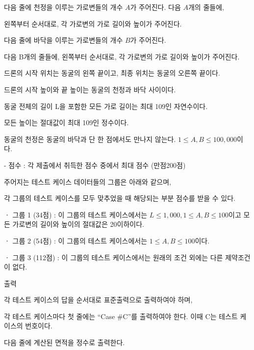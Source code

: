 \documentclass [12pt] {oblivoir}
\begin{document}
\vspace{3mm}

다음 줄에 천정을 이루는 가로변들의 개수 $A$가 주어진다. 다음 $A$개의 줄들에,

왼쪽부터 순서대로, 각 가로변의 가로 길이와 높이가 주어진다.

다음 줄에 바닥을 이루는 가로변들의 개수 $B$가 주어진다.

다음 B개의 줄들에, 왼쪽부터 순서대로, 각 가로변의 가로 길이와 높이가 주어진다.

\vspace{3mm}

드론의 시작 위치는 동굴의 왼쪽 끝이고, 최종 위치는 동굴의 오른쪽 끝이다.

드론의 시작 높이와 끝 높이는 동굴의 천정과 바닥 사이이다.

동굴 전체의 길이 L을 포함한 모든 가로 길이는 최대 109인 자연수이다.

모든 높이는 절대값이 최대 109인 정수이다.

동굴의 천정은 동굴의 바닥과 단 한 점에서도 만나지 않는다. $1 \le A, B \le 100,000$이다.

\vspace{3mm}

- 점수 : 각 제출에서 취득한 점수 중에서 최대 점수 (만점200점)

    주어지는 테스트 케이스 데이터들의 그룹은 아래와 같으며,

    각 그룹의 테스트 케이스를 모두 맞추었을 때 해당되는 부분 점수를 받을 수 있다.

    ㆍ 그룹 1 (34점) : 이 그룹의 테스트 케이스에서는 $L \le 1,000, 1 \le A, B \le 100$이고 모든 가로변의 길이와 높이의 절대값은 20이하이다.

    ㆍ 그룹 2 (54점) : 이 그룹의 테스트 케이스에서는 $1 \le A, B \le 100$이다.

    ㆍ 그룹 3 (112점) : 이 그룹의 테스트 케이스에서는 원래의 조건 외에는 다른 제약조건이 없다.

\vspace{5mm}

출력

\vspace{3mm}

각 테스트 케이스의 답을 순서대로 표준출력으로 출력하여야 하며,

각 테스트 케이스마다 첫 줄에는 “Case \#C”를 출력하여야 한다. 이때 C는 테스트 케이스의 번호이다.

다음 줄에 계산된 면적을 정수로 출력한다.

\vspace{5mm}
\end{document}
